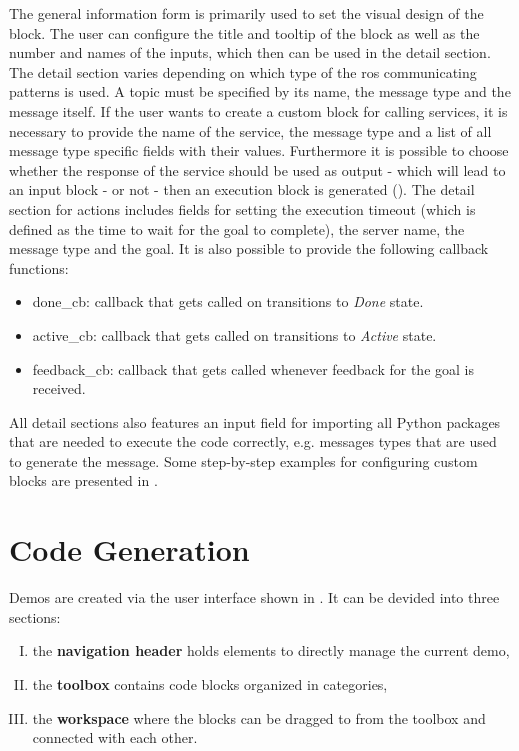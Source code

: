 The general information form is primarily used to set the visual design of the block. The user can configure the title and tooltip of the block as well as the number and names of the inputs, which then can be used in the detail section. The detail section varies depending on which type of the \gls{ros} communicating patterns is used. A topic must be specified by its name, the message type and the message itself. If the user wants to create a custom block for calling services, it is necessary to provide the name of the service, the message type and a list of all message type specific fields with their values. Furthermore it is possible to choose whether the response of the service should be used as output - which will lead to an input block - or not - then an execution block is generated (). The detail section for actions includes fields for setting the execution timeout (which is defined as the time to wait for the goal to complete), the server name, the message type and the goal. It is also possible to provide the following callback functions:

\begin{itemize}
	\item done\_cb: callback that gets called on transitions to  \textit{Done} state.
	\item active\_cb: callback that gets called on transitions to  \textit{Active} state.
	\item feedback\_cb: callback that gets called whenever feedback for the goal is received.
\end{itemize}

All detail sections also features an input field for importing all Python packages that are needed to execute the code correctly, e.g. messages types that are used to generate the message. Some step-by-step examples for configuring custom blocks are presented in .

\section{Code Generation} \label{sec:CodeGeneration}
Demos are created via the user interface shown in . It can be devided into three sections:

\begin{enumerate}[I.]
	\item the \textbf{navigation header} holds elements to directly manage the current demo,
	\item the \textbf{toolbox} contains code blocks organized in categories,
	\item the \textbf{workspace} where the blocks can be dragged to from the toolbox and connected with each other.
\end{enumerate}

